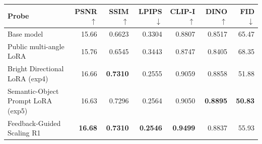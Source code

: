 \begin{tabular}{lrrrrrr}
\toprule
Probe & PSNR $\uparrow$ & SSIM $\uparrow$ & LPIPS $\downarrow$ & CLIP-I $\uparrow$ & DINO $\uparrow$ & FID $\downarrow$ \\
\midrule
Base model & 15.66 & 0.6623 & 0.3304 & 0.8807 & 0.8517 & 65.47 \\
Public multi-angle LoRA & 15.76 & 0.6545 & 0.3443 & 0.8747 & 0.8405 & 68.35 \\
Bright Directional LoRA (exp4) & 16.66 & \textbf{0.7310} & 0.2555 & 0.9059 & 0.8858 & 51.88 \\
Semantic-Object Prompt LoRA (exp5) & 16.63 & 0.7296 & 0.2564 & 0.9050 & \textbf{0.8895} & \textbf{50.83} \\
Feedback-Guided Scaling R1 & \textbf{16.68} & \textbf{0.7310} & \textbf{0.2546} & \textbf{0.9499} & 0.8837 & 55.93 \\
\bottomrule
\end{tabular}
